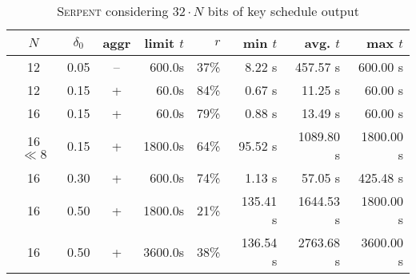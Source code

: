 \documentclass{llncs}
\newcommand{\Serpent}{\textsc{Serpent}\xspace}
\begin{document}
\begin{table}[htbp]
\begin{center}
\begin{tabular}{|c|c|c|r|r|r|r|r|}
\hline
$N$ & $\delta_0$ & aggr & limit $t$ & $r$ & min $t$ & avg. $t$ & max $t$\\
\hline
12 & 0.05 & --&  600.0s &  37\% &  8.22 s & 457.57 s& 600.00 s\\ %
\hline
12 & 0.15 & + &   60.0s &  84\% &  0.67 s & 11.25 s & 60.00 s\\ %
16 & 0.15 & + &   60.0s &  79\% &  0.88 s & 13.49 s & 60.00 s\\ %
16 $\ll 8$ & 0.15 & + &  1800.0s &  64\% &  95.52 s & 1089.80 s & 1800.00 s\\ %
\hline
16 & 0.30 & + &  600.0s &  74\% &  1.13 s & 57.05 s & 425.48 s\\ %
\hline
16 & 0.50 & + & 1800.0s &  21\% &  135.41 s & 1644.53 s & 1800.00 s\\ %
16 & 0.50 & + & 3600.0s &  38\% &  136.54 s & 2763.68 s & 3600.00 s\\ %
\hline
\end{tabular}
\end{center}
\caption{\Serpent considering $32 \cdot N$ bits of key schedule output}
\label{tab:serpent}
\end{table}
\end{document}

